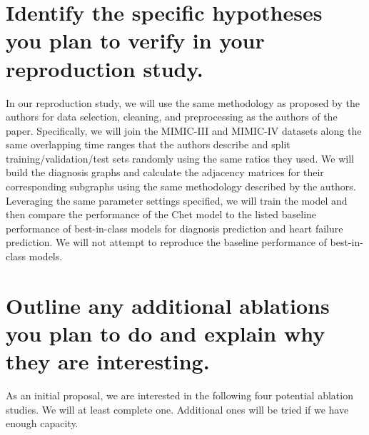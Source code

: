 \documentclass[11pt,a4paper]{article}
\begin{document}
\section{Identify the specific hypotheses you plan to verify in your
reproduction study.}
In our reproduction study, we will use the same methodology as proposed by the
authors for data selection, cleaning, and preprocessing as the authors of the
paper. Specifically, we will join the MIMIC-III \cite{mimic3} and MIMIC-IV
\cite{mimic4} datasets along the same overlapping time ranges that the authors
describe and split training/validation/test sets randomly using the same ratios
they used. We will build the diagnosis graphs and calculate the adjacency
matrices for their corresponding subgraphs using the same methodology described
by the authors. Leveraging the same parameter settings specified, we will train
the model and then compare the performance of the Chet model to the listed
baseline performance of best-in-class models for diagnosis prediction and heart
failure prediction. We will not attempt to reproduce the baseline performance of
best-in-class models.

\section{Outline any additional ablations you plan to do and
explain why they are interesting.}
As an initial proposal, we are interested in the following four potential ablation studies. We will at least complete one. Additional ones
will be tried if we have enough capacity.
\end{document}
